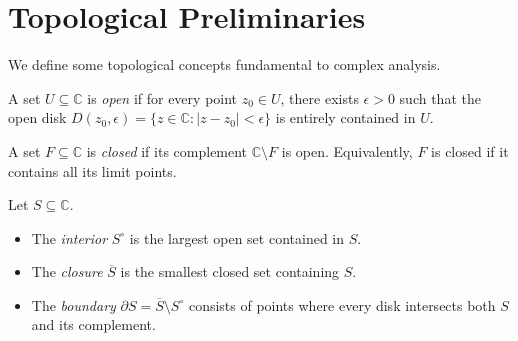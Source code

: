 \section{Topological Preliminaries}

We define some topological concepts fundamental to complex analysis.

\begin{definition}
  A set $U \subseteq \mathbb{C}$ is \emph{open} if for every point $z_0 \in U$, there exists $\epsilon > 0$ such that the open disk $D(z_0, \epsilon) = \{z \in \mathbb{C} : |z - z_0| < \epsilon\}$ is entirely contained in $U$.
\end{definition}

\begin{center}
\end{center}

\begin{definition}
  A set $F \subseteq \mathbb{C}$ is \emph{closed} if its complement $\mathbb{C} \setminus F$ is open.
  Equivalently, $F$ is closed if it contains all its limit points.
\end{definition}

\begin{definition}
  Let $S \subseteq \mathbb{C}$.
  \begin{itemize}
    \item The \emph{interior} $S^\circ$ is the largest open set contained in $S$.
    \item The \emph{closure} $\overline{S}$ is the smallest closed set containing $S$.
    \item The \emph{boundary} $\partial S = \overline{S} \setminus S^\circ$ consists of points where every disk intersects both $S$ and its complement.
  \end{itemize}
\end{definition}

